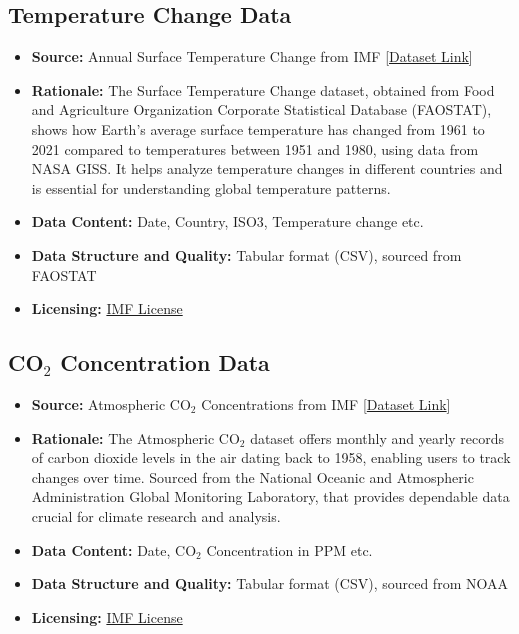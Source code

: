 \documentclass{article}
\begin{document}
\subsection{Temperature Change Data}
   \begin{itemize}
       \item \textbf{Source:} Annual Surface Temperature Change from IMF [\href{https://climatedata.imf.org/datasets/4063314923d74187be9596f10d034914/explore}{Dataset Link}]
       \item \textbf{Rationale:} The Surface Temperature Change dataset, obtained from Food and Agriculture Organization Corporate Statistical Database (FAOSTAT), shows how Earth's average surface temperature has changed from 1961 to 2021 compared to temperatures between 1951 and 1980, using data from NASA GISS. It helps analyze temperature changes in different countries and is essential for understanding global temperature patterns.
       \item \textbf{Data Content:} Date, Country, ISO3, Temperature change etc.
       \item \textbf{Data Structure and Quality:} Tabular format (CSV), sourced from FAOSTAT 
       \item \textbf{Licensing:} \href{https://www.imf.org/external/terms.htm}{IMF License}
   \end{itemize}

\subsection{CO$_2$  Concentration Data}
   \begin{itemize}
       \item \textbf{Source:} Atmospheric CO$_2$ Concentrations from IMF [\href{https://climatedata.imf.org/datasets/9c3764c0efcc4c71934ab3988f219e0e/explore}{Dataset Link}]
       \item \textbf{Rationale:} The Atmospheric CO$_2$ dataset offers monthly and yearly records of carbon dioxide levels in the air dating back to 1958, enabling users to track changes over time. Sourced from the National Oceanic and Atmospheric Administration Global Monitoring Laboratory, that provides dependable data crucial for climate research and analysis.
       \item \textbf{Data Content:} Date, CO$_2$ Concentration in PPM etc.
       \item \textbf{Data Structure and Quality:} Tabular format (CSV), sourced from NOAA 
       \item \textbf{Licensing:} \href{https://www.imf.org/external/terms.htm}{IMF License}
   \end{itemize}
\end{document}
